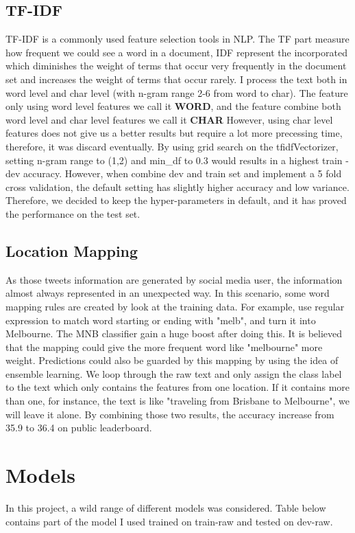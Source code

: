 \documentclass[11pt]{article}
\begin{document}
\subsection{TF-IDF}
TF-IDF is a commonly used feature selection tools in NLP.
The TF part measure how frequent we could see a word in a document, 
IDF represent the incorporated which diminishes the weight of terms that 
occur very frequently in the document set and increases the 
weight of terms that occur rarely. I process the text both in word level and char level (with n-gram range 2-6 from word to char).
The feature only using word level features we call it \textbf{WORD}, 
and the feature combine both word level
and char level features we call it \textbf{CHAR}
However, using char level features does not give us a better results 
but require a lot more precessing time, therefore, it was discard eventually.
By using grid search on the tfidfVectorizer, setting n-gram range to (1,2) and min\_df to 0.3
would results in a highest train - dev accuracy. However, when combine dev and train set and implement a
5 fold cross validation, the default setting has slightly higher accuracy and low variance. 
Therefore, we decided to keep the hyper-parameters in default, and it has proved the performance on the test set.

\subsection{Location Mapping}
As those tweets information are generated by social media user, the information almost always represented in an unexpected way.
In this scenario, some word mapping rules are created by look at the training data. For example, use regular expression to match 
word starting or ending with "melb", and turn it into Melbourne. The MNB classifier gain a huge boost after doing this. It is believed
that the mapping could give the more frequent word like "melbourne" more weight. Predictions could also be guarded
by this mapping by using the idea of ensemble learning. We loop through the raw text and only assign the class label to the text which 
only contains the features from one location. If it contains more than one, for instance, the text is like "traveling from Brisbane to 
Melbourne", we will leave it alone. By combining those two results, the accuracy increase from 35.9 to 36.4 on public leaderboard.

\section{Models}
In this project, a wild range of different models was considered. Table below contains part of the model I used trained on train-raw and 
tested on dev-raw. 
\end{document}

